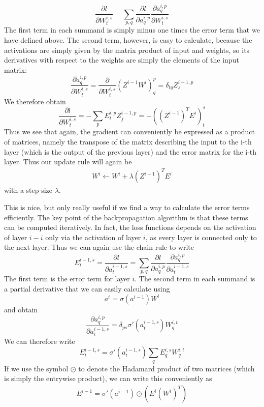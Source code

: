 \documentclass[a4paper, draft]{report}
\numberwithin{section}{chapter}
\numberwithin{equation}{chapter}
\theoremstyle{own}
\theoremstyle{remark}
\begin{document}
$$
\frac{\partial l}{\partial W^{i,s}_t} = \sum_{p,q} \frac{\partial l}{\partial a^{i,p}_q} \frac{\partial a^{i,p}_q}{\partial W^{i,s}_t} 
$$
The first term in each summand is simply minus one times the error term that we have defined above. The second term, however, is easy to calculate, because the activations are simply given by the matrix product of input and weights, so its derivatives with respect to the weights are simply the elements
of the input matrix:
$$
\frac{\partial a^{i,p}_q}{\partial W^{i,s}_t}  = \frac{\partial}{\partial W^{i,s}_t} (Z^{i-1} W^i)^p_q = \delta_{tq} Z^{i-1,p}_s
$$
We therefore obtain
$$
\frac{\partial l}{\partial W^{i,s}_t} = - \sum_p  E^{i,p}_t Z^{i-1,p}_j = - ((Z^{i-1})^T E^i)^s_t
$$
Thus we see that again, the gradient can conveniently be expressed as a product of matrices, namely the transpose of the matrix describing the input to the i-th layer (which is the output of the previous layer) and the error matrix for the i-th layer. Thus our update rule will again be
\begin{align}\label{eq:iterativeweightupdate}
W^i \leftarrow W^i + \lambda (Z^{i-1})^T E^i
\end{align}
with a step size $\lambda$. 

This is nice, but only really useful if we find a way to calculate the error terms efficiently. The key point of the backpropagation algorithm is that these terms can be computed iteratively. In fact, the loss functions  depends on the activation of layer $i-i$ only via the activation of layer $i$, as every layer is connected only to the next layer. Thus we can again use the chain rule to write
$$
E^{i-1,s}_t = \frac{\partial l}{\partial a^{i-1,s}_t} = \sum_{p,q}  \frac{\partial l}{\partial a^{i,p}_q}  \frac{\partial a^{i,p}_q}{\partial a^{i-1,s}_t}
$$
The first term is the error term for layer $i$. The second term in each summand is a partial derivative that we can easily calculate using
$$
a^i = \sigma(a^{i-1}) W^i
$$
and obtain
$$
\frac{\partial a^{i,p}_q}{\partial a^{i-1,s}_t} = \delta_{ps} \sigma' (a^{i-1,s}_t) W^{i,t}_q
$$
We can therefore write
$$
E^{i-1,s}_t = \sigma'(a^{i-1,s}_t) \sum_q E^{i,s}_q W^{i,t}_q
$$
If we use the symbol $\odot$ to denote the Hadamard product of two matrices (which is simply the entrywise product), we can write this conveniently as
\begin{align}\label{eq:iterativeerrorterm}
E^{i-1} = \sigma'(a^{i-1}) \odot (E^i (W^i)^T)
\end{align}
\end{document}

